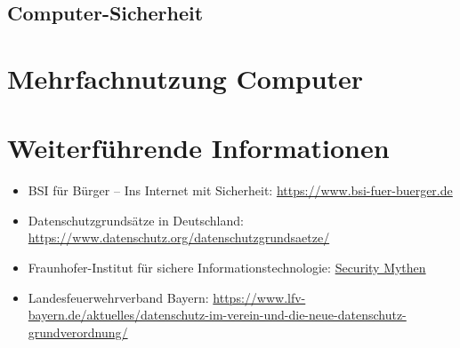 \subsection{Computer-Sicherheit}


\section{Mehrfachnutzung Computer}


\section{Weiterführende Informationen}

\begin{frame}
\begin{itemize}
	\item BSI für Bürger -- Ins Internet mit Sicherheit:  \href{https://www.bsi-fuer-buerger.de}{https://www.bsi-fuer-buerger.de}
	\item Datenschutzgrundsätze in Deutschland: \href{https://www.datenschutz.org/datenschutzgrundsaetze/}{https://www.datenschutz.org/datenschutzgrundsaetze/}
	\item Fraunhofer-Institut für sichere Informationstechnologie: \href{https://www.sit.fraunhofer.de/fileadmin/dokumente/sonstiges/Security-Mythen.pdf}{Security Mythen}
	\item Landesfeuerwehrverband Bayern: \href{https://www.lfv-bayern.de/aktuelles/datenschutz-im-verein-und-die-neue-datenschutz-grundverordnung/}{https://www.lfv-bayern.de/aktuelles/datenschutz-im-verein-und-die-neue-datenschutz-grundverordnung/}
\end{itemize}
\end{frame}

